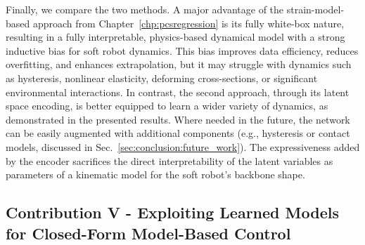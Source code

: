 Finally, we compare the two methods. A major advantage of the strain-model-based approach from Chapter~\ref{chp:pcsregression} is its fully white-box nature, resulting in a fully interpretable, physics-based dynamical model with a strong inductive bias for soft robot dynamics. This bias improves data efficiency, reduces overfitting, and enhances extrapolation, but it may struggle with dynamics such as hysteresis, nonlinear elasticity, deforming cross-sections, or significant environmental interactions. In contrast, the second approach, through its latent space encoding, is better equipped to learn a wider variety of dynamics, as demonstrated in the presented results. Where needed in the future, the network can be easily augmented with additional components (e.g., hysteresis or contact models, discussed in Sec.~\ref{sec:conclusion:future_work}).
The expressiveness added by the encoder sacrifices the direct interpretability of the latent variables as parameters of a kinematic model for the soft robot’s backbone shape.

\subsection{Contribution V - Exploiting Learned Models for Closed-Form Model-Based Control}


